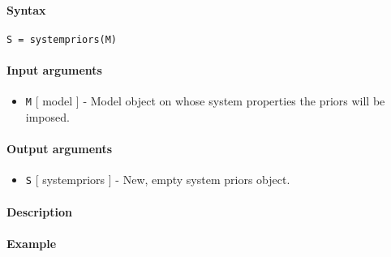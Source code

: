 


	\paragraph{Syntax}

\begin{verbatim}
S = systempriors(M)
\end{verbatim}

\paragraph{Input arguments}

\begin{itemize}
\itemsep1pt\parskip0pt
\item
  \texttt{M} {[} model {]} - Model object on whose system properties the
  priors will be imposed.
\end{itemize}

\paragraph{Output arguments}

\begin{itemize}
\itemsep1pt\parskip0pt
\item
  \texttt{S} {[} systempriors {]} - New, empty system priors object.
\end{itemize}

\paragraph{Description}

\paragraph{Example}


